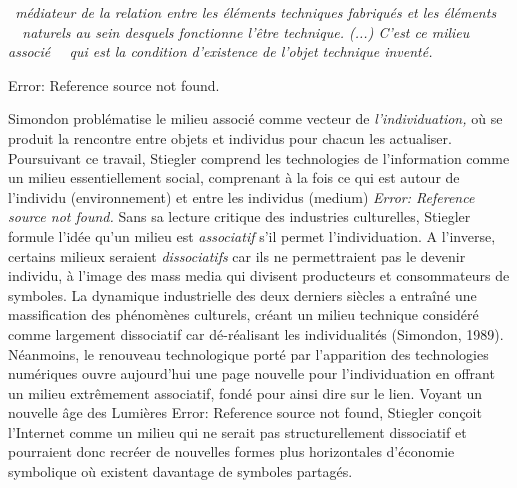 {\color{black}
\textit{{\guillemotleft}~m\'ediateur de la relation entre les \'el\'ements techniques fabriqu\'es et les \'el\'ements
\ \ naturels au sein desquels fonctionne l'\^etre technique. (...) C'est ce milieu associ\'e \ \ qui est la condition
d'existence de l'objet technique invent\'e.~{\guillemotright} }}

{\raggedleft\color{black}
Error: Reference source not found. 
\par}


\bigskip

{\color{black}
Simondon probl\'ematise le milieu associ\'e comme vecteur de \textit{l'individuation,} o\`u se produit la rencontre
entre objets et individus pour chacun les actualiser. Poursuivant ce travail, Stiegler comprend les technologies de
l'information comme un milieu essentiellement social, comprenant \`a la fois ce\textit{ }qui est autour de l'individu
(environnement) et entre les individus (medium)\textit{ }\textit{Error: Reference source not found}\textit{.} Sans sa
lecture critique des industries culturelles, Stiegler formule l'id\'ee qu'un milieu est \textit{associatif} s'il permet
l'individuation. A l'inverse, certains milieux seraient \textit{dissociatifs} car ils ne permettraient pas le devenir
individu, \`a l'image des mass media qui divisent producteurs et consommateurs de symboles. La dynamique industrielle
des deux derniers si\`ecles a entra\^in\'e une massification des ph\'enom\`enes culturels, cr\'eant un milieu technique
consid\'er\'e comme largement dissociatif car d\'e-r\'ealisant les individualit\'es (Simondon, 1989). N\'eanmoins, le
renouveau technologique port\'e par l'apparition des technologies num\'eriques ouvre aujourd'hui une page nouvelle pour
l'individuation en offrant un milieu extr\^emement associatif, fond\'e pour ainsi dire sur le lien. Voyant un nouvelle
\^age des Lumi\`eres Error: Reference source not found, Stiegler con\c{c}oit l'Internet comme un milieu qui ne serait
pas structurellement dissociatif et pourraient donc recr\'eer de nouvelles formes plus horizontales d'\'economie
symbolique o\`u existent davantage de symboles partag\'es. }

